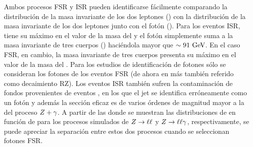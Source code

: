 Ambos procesos \ac{FSR} y \ac{ISR} pueden identificarse fácilmente comparando la distribución de la masa invariante de los dos leptones (\mll) con la distribución de la masa invariante de los dos leptones junto con el fotón (\mlly).
Para los eventos \ac{ISR}, \mll tiene su máximo en el valor de la masa del \Zboson y el fotón simplemente suma a la masa invariante de tres cuerpos (\mlly) haciéndola mayor que \(\sim 91~\text{GeV}\). En el caso \ac{FSR}, en cambio, la masa invariante de tres cuerpos \mlly presenta su máximo en el valor de la masa del \Zboson.
Para los estudios de identificación de fotones sólo se consideran los fotones de los eventos \ac{FSR} (de ahora en más también referido como decaimiento \acf{RZ}). Los eventos \ac{ISR} también sufren la contaminación de fondos provenientes de eventos \Zjets, en los que el jet se identifica erróneamente como un fotón y además la sección eficaz \Zjets es de varios órdenes de magnitud mayor a la del proceso \(Z+\gamma\). A partir de las \Figs{\ref{fig:pid_ss:event_selection:mll_mlly_distribution:bkg}}{\ref{fig:pid_ss:event_selection:mll_mlly_distribution:signal}} donde se muestran las distribuciones de \mll en función de \mlly para los procesos simulados de \(Z\rightarrow\ell\ell\) y \(Z\rightarrow\ell\ell\gamma\), respectivamente, se puede apreciar la separación entre estos dos procesos cuando se seleccionan fotones \ac{FSR}.

